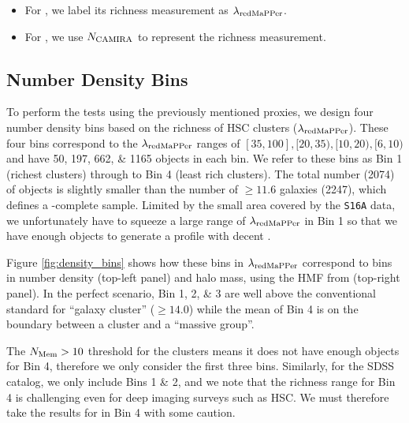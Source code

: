 \documentclass[fleqn,usenatbib,useAMS,english]{mnras}
\begin{document}
    \begin{itemize}

        \item For \redm{}, we label its richness measurement as $\lambda_{\rm redMaPPer}$.

        \item For \camira{}, we use $N_{\rm CAMIRA}$ to represent the richness measurement.

    \end{itemize}

\subsection{Number Density Bins}
    \label{sec:binning}

    To perform the \topn{} tests using the previously mentioned proxies, we design four number
    density bins based on the richness of HSC \redm{} clusters ($\lambda_{\rm redMaPPer}$).
    These four bins correspond to the $\lambda_{\rm redMaPPer}$ ranges of $[35, 100], [20, 35),
    [10, 20), [6, 10)$ and have 50, 197, 662, \& 1165 objects in each bin.
    We refer to these bins as Bin 1 (richest clusters) through to Bin 4 (least rich clusters).
    The total number (2074) of objects is slightly smaller than the number of $\geq
    11.6$ galaxies (2247), which defines a \mstar{}-complete sample.
    Limited by the small area covered by the \texttt{S16A} data, we unfortunately have to squeeze
    a large range of $\lambda_{\rm redMaPPer}$ in Bin 1 so that we have enough objects
    to generate a \dsigma{} profile with decent \snratio{}.

    Figure \ref{fig:density_bins} shows how these bins in $\lambda_{\rm redMaPPer}$ correspond to
    bins in number density (top-left panel) and halo mass, using the HMF from 
    (top-right panel).
    In the perfect scenario, Bin 1, 2, \& 3 are well above the conventional standard for
    ``galaxy cluster'' (\logmvir{}$\geq 14.0$) while the mean \mvir{} of Bin 4 is on the boundary
    between a cluster and a ``massive group''.

    The $N_{\rm Mem} > 10$ threshold for the \camira{} clusters means it does not have enough
    objects for Bin 4, therefore we only consider the first three bins.
    Similarly, for the SDSS \redm{} catalog, we only include Bins 1 \& 2, and we note that the
    richness range for Bin 4 is challenging even for deep imaging surveys such as HSC.
    We must therefore take the results for \redm{} in Bin 4 with some caution.
\end{document}

